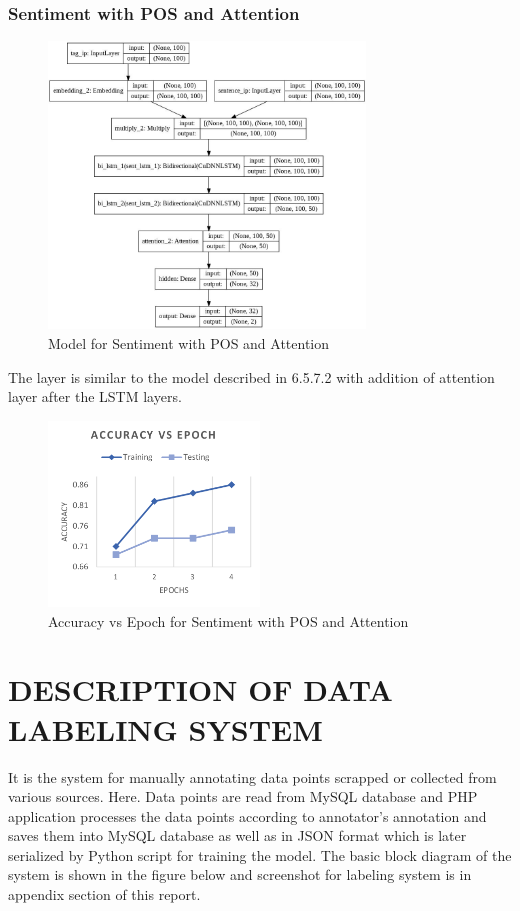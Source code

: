            \subsubsection{Sentiment with POS and Attention}
        \begin{figure}[hbt!]
            \centering
                \includegraphics[width=0.75\textwidth]{./img/6.22.jpg}
                \caption{Model for Sentiment with POS and Attention}
        \end{figure}
The layer is similar to the model described in 6.5.7.2 with addition of attention layer
after the LSTM layers.
        \begin{figure}[h]
            \centering
                \includegraphics[width=0.5\textwidth]{./img/6.23.png}
                \caption{Accuracy vs Epoch for Sentiment with POS and Attention}
        \end{figure}
        \section{DESCRIPTION OF DATA LABELING SYSTEM}
It is the system for manually annotating data points scrapped or collected from various
sources. Here. Data points are read from MySQL database and PHP application
processes the data points according to annotator’s annotation and saves them into
MySQL database as well as in JSON format which is later serialized by Python script
for training the model. The basic block diagram of the system is shown in the figure
below and screenshot for labeling system is in appendix section of this report.

